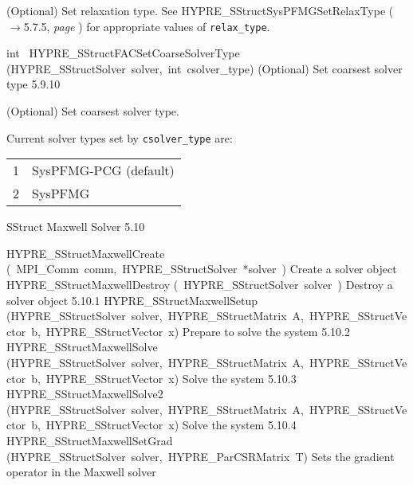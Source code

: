 \documentclass{article}
\begin{document}
\begin{cxxentry}
\begin{cxxentry}
\begin{cxxfunction}
\begin{cxxdoc}
(Optional) Set relaxation type.  See HYPRE\_SStructSysPFMGSetRelaxType ($\rightarrow$5.7.5, {\em page \pageref{cxx.5.7.5}})
for appropriate values of {\tt relax\_type}.
\end{cxxdoc}
\end{cxxfunction}
\begin{cxxfunction}
{int\ }
        {HYPRE\_SStructFACSetCoarseSolverType}
        {(HYPRE\_SStructSolver\ solver,\ int\ csolver\_type)}
        {
(Optional) Set coarsest solver type}
        {5.9.10}
\begin{cxxdoc}

(Optional) Set coarsest solver type.

Current solver types set by {\tt csolver\_type} are:

\begin{tabular}{l@{ -- }l}
1 & SysPFMG-PCG (default) \\
2 & SysPFMG \\
\end{tabular}
\end{cxxdoc}
\end{cxxfunction}
\end{cxxentry}
\begin{cxxentry}
{}
        {SStruct Maxwell Solver}
        {}
        {
}
        {5.10}
\begin{cxxnames}
        {HYPRE\_SStructMaxwellCreate}
        {(\ MPI\_Comm\ comm,\ HYPRE\_SStructSolver\ *solver\ )}
        {
Create a solver object}
        {}
\label{cxx.5.10.6}
        {HYPRE\_SStructMaxwellDestroy}
        {(\ HYPRE\_SStructSolver\ solver\ )}
        {
Destroy a solver object}
        {5.10.1}
        {HYPRE\_SStructMaxwellSetup}
        {(HYPRE\_SStructSolver\ solver,\ HYPRE\_SStructMatrix\ A,\ HYPRE\_SStructVector\ b,\ HYPRE\_SStructVector\ x)}
        {
Prepare to solve the system}
        {5.10.2}
        {HYPRE\_SStructMaxwellSolve}
        {(HYPRE\_SStructSolver\ solver,\ HYPRE\_SStructMatrix\ A,\ HYPRE\_SStructVector\ b,\ HYPRE\_SStructVector\ x)}
        {
Solve the system}
        {5.10.3}
        {HYPRE\_SStructMaxwellSolve2}
        {(HYPRE\_SStructSolver\ solver,\ HYPRE\_SStructMatrix\ A,\ HYPRE\_SStructVector\ b,\ HYPRE\_SStructVector\ x)}
        {
Solve the system}
        {5.10.4}
        {HYPRE\_SStructMaxwellSetGrad}
        {(HYPRE\_SStructSolver\ solver,\ HYPRE\_ParCSRMatrix\ T)}
        {
Sets the gradient operator in the Maxwell solver}
        {}
\label{cxx.5.10.7}

\end{cxxnames}
\end{cxxentry}
\end{cxxentry}
\end{document}
